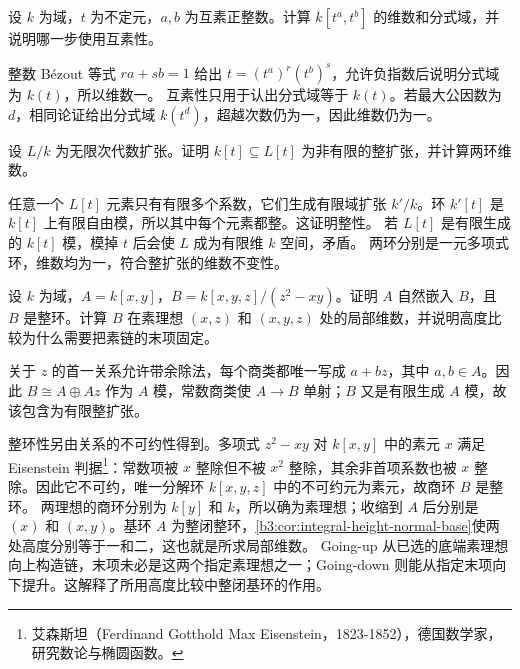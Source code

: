 \begin{exercise}\label{b3:ex:09-monomial-curve-dimension}
	设 \(k\) 为域，\(t\) 为不定元，\(a,b\) 为互素正整数。计算 \(k[t^a,t^b]\) 的维数和分式域，并说明哪一步使用互素性。
\end{exercise}
\begin{solution}
	整数 Bézout 等式 \(ra+sb=1\) 给出 \(t=(t^a)^r(t^b)^s\)，允许负指数后说明分式域为 \(k(t)\)，所以维数一。 互素性只用于认出分式域等于 \(k(t)\)。若最大公因数为 \(d\)，相同论证给出分式域 \(k(t^d)\)，超越次数仍为一，因此维数仍为一。
\end{solution}

\begin{exercise}\label{b3:ex:09-nonfinite-integral}
	设 \(L/k\) 为无限次代数扩张。证明 \(k[t]\subseteq L[t]\) 为非有限的整扩张，并计算两环维数。
\end{exercise}
\begin{solution}
	任意一个 \(L[t]\) 元素只有有限多个系数，它们生成有限域扩张 \(k'/k\)。环 \(k'[t]\) 是 \(k[t]\) 上有限自由模，所以其中每个元素都整。这证明整性。 若 \(L[t]\) 是有限生成的 \(k[t]\) 模，模掉 \(t\) 后会使 \(L\) 成为有限维 \(k\) 空间，矛盾。 两环分别是一元多项式环，维数均为一，符合整扩张的维数不变性。
\end{solution}

\begin{exercise}\label{b3:ex:09-local-integral-height}
	设 \(k\) 为域，\(A=k[x,y]\)，\(B=k[x,y,z]/(z^2-xy)\)。证明 \(A\) 自然嵌入 \(B\)，且 \(B\) 是整环。计算 \(B\) 在素理想 \((x,z)\) 和 \((x,y,z)\) 处的局部维数，并说明高度比较为什么需要把素链的末项固定。
\end{exercise}
\begin{solution}
	关于 \(z\) 的首一关系允许带余除法，每个商类都唯一写成 \(a+bz\)，其中 \(a,b\in A\)。因此 \(B\cong A\oplus Az\) 作为 \(A\) 模，常数商类使 \(A\rightarrow B\) 单射；\(B\) 又是有限生成 \(A\) 模，故该包含为有限整扩张。

	整环性另由关系的不可约性得到。多项式 \(z^2-xy\) 对 \(k[x,y]\) 中的素元 \(x\) 满足 Eisenstein 判据\footnote{艾森斯坦（Ferdinand Gotthold Max Eisenstein，1823-1852），德国数学家，研究数论与椭圆函数。}：常数项被 \(x\) 整除但不被 \(x^2\) 整除，其余非首项系数也被 \(x\) 整除。因此它不可约，唯一分解环 \(k[x,y,z]\) 中的不可约元为素元，故商环 \(B\) 是整环。 两理想的商环分别为 \(k[y]\) 和 \(k\)，所以确为素理想；收缩到 \(A\) 后分别是 \((x)\) 和 \((x,y)\)。基环 \(A\) 为整闭整环，\cref{b3:cor:integral-height-normal-base}使两处高度分别等于一和二，这也就是所求局部维数。 Going-up 从已选的底端素理想向上构造链，末项未必是这两个指定素理想之一；Going-down 则能从指定末项向下提升。这解释了所用高度比较中整闭基环的作用。
\end{solution}

